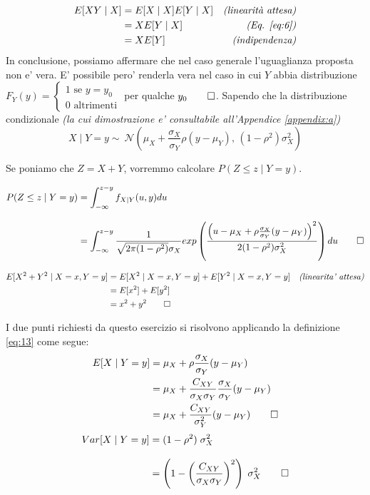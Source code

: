 \documentclass{homework}
\begin{document}
\exercise*[3.f]
\[
\begin{align}
E[XY \mid X] &= E[X \mid X] E[Y \mid X]&\emph{(linearità attesa)} \\
             &= X E[Y \mid X] &\emph{(Eq. \ref{eq:6})}\\
             &= X E[Y] &\emph{(indipendenza)}
\end{align}
\]
In conclusione, possiamo affermare che nel caso generale l'uguaglianza proposta non e' vera. E' possibile pero' renderla vera nel caso in cui $Y$ abbia distribuzione $F_Y(y) = \begin{cases}1 \text{ se } y=y_0\\ 0\text{ altrimenti}\end{cases}$ per qualche $y_0 \qed$.
\exercise*[4.a]
Sapendo che la distribuzione condizionale \emph{(la cui dimostrazione e' consultabile all'Appendice \ref{appendix:a})}
\begin{equation} \label{eq:13}
    X \mid Y=y \sim \ {\mathcal {N}}\left(\mu_{X}+{\frac {\sigma_{X}}{\sigma_{Y}}}\rho (y -\mu_{Y}),\,(1-\rho^{2})\sigma_{X}^{2}\right)
\end{equation}

Se poniamo che $Z = X + Y$, vorremmo calcolare $P(Z \leq z \mid Y = y)$.

\[
\begin{align}
P(Z \leq z \mid Y = y) &=  \int_{-\infty}^{z-y} f_{X|Y}(u,y) du\\[2ex]
                       &=  \int_{-\infty}^{z-y} \frac{1}{\sqrt{2 \pi (1 - \rho^2)} \sigma_X} exp \left( \frac{ \left(u - \mu_X + \rho \frac{\sigma_X}{\sigma_Y}(y - \mu_Y) \right)^2}{2(1-\rho^2)\sigma_X^2}\right) du \qed
\end{align}
\]

\exercise*[4.b]
\[
\begin{align}
E[X^2 + Y^2 \mid X = x, Y = y] &= E[X^2 \mid X = x, Y = y] + E[Y^2 \mid X = x, Y = y] &\emph{(linearita' attesa)}\\
&= E[x^2] + E[y^2] & \\
&= x^2 + y^2 \qed &
\end{align}
\]

\exercise*[4.c]
I due punti richiesti da questo esercizio si risolvono applicando la definizione \ref{eq:13} come segue:
\[
    \begin{align}
        E[X \mid Y = y] &= \mu_X + \rho \frac{\sigma_X}{\sigma_Y}(y - \mu_Y)\\
                        &= \mu_X + \frac{C_{XY}}{\sigma_X \sigma_Y} \frac{\sigma_X}{\sigma_Y}(y - \mu_Y) \\
                        &= \mu_X + \frac{C_{XY}}{\sigma_Y^2}(y - \mu_Y) \qed
    \end{align}
\]
\[
    \begin{align}
        Var[X \mid Y = y] &= (1-\rho^{2})\; \sigma_{X}^{2} \\[2ex]
                          &= \left( 1 - \left( \frac{C_{XY}}{\sigma_X \sigma_Y} \right )^2 \right) \; \sigma_{X}^2 \qed
    \end{align}
\]
\end{document}
